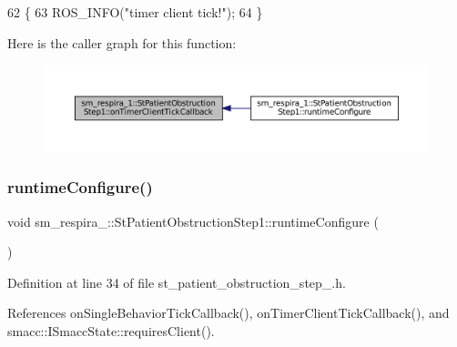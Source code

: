 \begin{DoxyCode}
62     \{
63         ROS\_INFO(\textcolor{stringliteral}{"timer client tick!"});
64     \}
\end{DoxyCode}
Here is the caller graph for this function\+:
\nopagebreak
\begin{figure}[H]
\begin{center}
\leavevmode
\includegraphics[width=350pt]{structsm__respira__1_1_1StPatientObstructionStep1_a330f5d86b827dedd1ca72d7356215c49_icgraph}
\end{center}
\end{figure}
\mbox{\label{structsm__respira__1_1_1StPatientObstructionStep1_a99ac90de739317e8c0c47916fafd057a}} 
\subsubsection{\texorpdfstring{runtime\+Configure()}{runtimeConfigure()}}
{\footnotesize\ttfamily void sm\+\_\+respira\+\_\+::\+St\+Patient\+Obstruction\+Step1\+::runtime\+Configure (\begin{DoxyParamCaption}{ }\end{DoxyParamCaption})\hspace{0.3cm}{\ttfamily [inline]}}



Definition at line 34 of file st\+\_\+patient\+\_\+obstruction\+\_\+step\+\_.\+h.



References on\+Single\+Behavior\+Tick\+Callback(), on\+Timer\+Client\+Tick\+Callback(), and smacc\+::\+I\+Smacc\+State\+::requires\+Client().


